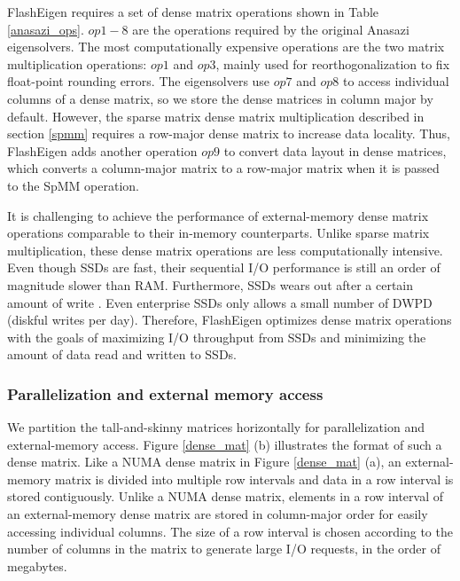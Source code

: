 FlashEigen requires a set of dense matrix operations shown in Table
\ref{anasazi_ops}. $op1-8$ are the operations required by the original Anasazi
eigensolvers. The most computationally expensive operations are the two
matrix multiplication operations: $op1$ and $op3$, mainly used for
reorthogonalization to fix float-point rounding errors. The eigensolvers
use $op7$ and $op8$ to access individual columns of a dense matrix,
so we store the dense matrices in column major by default.
However, the sparse matrix dense matrix multiplication described in section
\ref{spmm} requires a row-major dense matrix to increase data locality.
Thus, FlashEigen adds another operation $op9$ to convert data layout
in dense matrices, which converts a column-major matrix to a row-major
matrix when it is passed to the SpMM operation.

It is challenging to achieve the performance of external-memory dense matrix
operations comparable to their in-memory counterparts. Unlike sparse matrix
multiplication, these dense matrix operations are less computationally
intensive. Even though SSDs are fast, their sequential I/O performance is
still an order of magnitude slower than RAM.
Furthermore, SSDs wears out after a certain amount of write \cite{}.
Even enterprise SSDs \cite{} only allows a small number of DWPD
(diskful writes per day). Therefore, FlashEigen optimizes dense matrix operations
with the goals of maximizing I/O throughput from SSDs and minimizing the amount
of data read and written to SSDs.

%		

\subsubsection{Parallelization and external memory access}
We partition the tall-and-skinny matrices horizontally for parallelization
and external-memory access. Figure \ref{dense_mat} (b) illustrates the format
of such a dense matrix. Like a NUMA dense matrix in Figure \ref{dense_mat} (a),
an external-memory matrix is divided into multiple row intervals and data
in a row interval is stored contiguously. Unlike a NUMA dense matrix, elements
in a row interval of an external-memory dense matrix are stored in column-major order
for easily accessing individual columns. The size of a row interval is chosen
according to the number of columns in the matrix to generate large I/O requests,
in the order of megabytes.

